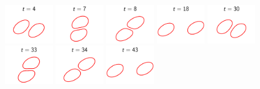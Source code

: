 \documentclass[%
preprint,
 amsmath,amssymb,
 aps,
]{revtex4-1}
\begin{document}
\begin{figure}[htp]
  \includegraphics[width=0.19\textwidth]{figs/shear_adR4em1adS7em1Chi1e0_ra090_timestep01.pdf}
  \includegraphics[width=0.19\textwidth]{figs/shear_adR4em1adS7em1Chi1e0_ra090_timestep02.pdf}
  \includegraphics[width=0.19\textwidth]{figs/shear_adR4em1adS7em1Chi1e0_ra090_timestep03.pdf}
  \includegraphics[width=0.19\textwidth]{figs/shear_adR4em1adS7em1Chi1e0_ra090_timestep04.pdf}
  \includegraphics[width=0.19\textwidth]{figs/shear_adR4em1adS7em1Chi1e0_ra090_timestep05.pdf}
  \includegraphics[width=0.19\textwidth]{figs/shear_adR4em1adS7em1Chi1e0_ra090_timestep06.pdf}
  \includegraphics[width=0.19\textwidth]{figs/shear_adR4em1adS7em1Chi1e0_ra090_timestep07.pdf}
  \includegraphics[width=0.19\textwidth]{figs/shear_adR4em1adS7em1Chi1e0_ra090_timestep08.pdf}

\end{figure}
\end{document}
